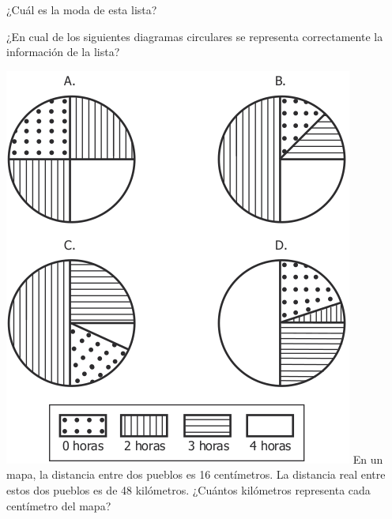 \documentclass[10pt,letterpaper,addpoints]{exam}
\begin{document}
\begin{questions}
\begin{multicols}{2}
\begin{oneparchoices}
\end{oneparchoices}
  \question \label{q8} ¿Cuál es la moda de esta lista?
  
\begin{oneparchoices}
         
\end{oneparchoices}
  \question \label{q9} ¿En cual de los siguientes diagramas circulares se representa correctamente la información de la lista?
  
  \includegraphics[scale=.5]{Images/diagramas-circulares.png}
  \question En un mapa, la distancia entre dos pueblos es 16 centímetros. La distancia real entre estos dos pueblos es de 48 kilómetros. ¿Cuántos kilómetros representa cada centímetro del mapa?


\end{multicols}
\end{questions}
\end{document}
